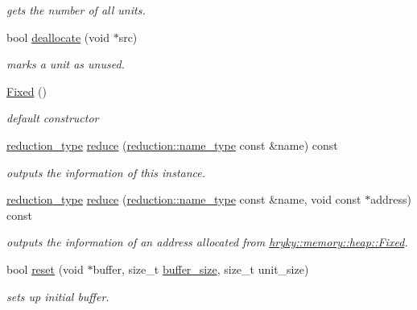 \begin{DoxyCompactItemize}
\begin{DoxyCompactList}\small\item\em gets the number of all units. \end{DoxyCompactList}\item 
bool \hyperlink{classhryky_1_1memory_1_1heap_1_1_fixed_a878f3a61bf397f27c40ec6638b88bd49}{deallocate} (void $\ast$src)
\begin{DoxyCompactList}\small\item\em marks a unit as unused. \end{DoxyCompactList}\item 
\hyperlink{classhryky_1_1memory_1_1heap_1_1_fixed_ab063172ff9026356d34cac6dc39a207a}{Fixed} ()
\begin{DoxyCompactList}\small\item\em default constructor \end{DoxyCompactList}\item 
\hyperlink{namespacehryky_a343a9a4c36a586be5c2693156200eadc}{reduction\-\_\-type} \hyperlink{classhryky_1_1memory_1_1heap_1_1_fixed_ae7e05d5e6c2e2f83e1d593f4eab28bd7}{reduce} (\hyperlink{namespacehryky_1_1reduction_ac686c30a4c8d196bbd0f05629a6b921f}{reduction\-::name\-\_\-type} const \&name) const 
\begin{DoxyCompactList}\small\item\em outputs the information of this instance. \end{DoxyCompactList}\item 
\hyperlink{namespacehryky_a343a9a4c36a586be5c2693156200eadc}{reduction\-\_\-type} \hyperlink{classhryky_1_1memory_1_1heap_1_1_fixed_a2bf9c59881f3e171d4e78b7fc0393f64}{reduce} (\hyperlink{namespacehryky_1_1reduction_ac686c30a4c8d196bbd0f05629a6b921f}{reduction\-::name\-\_\-type} const \&name, void const $\ast$address) const 
\begin{DoxyCompactList}\small\item\em outputs the information of an address allocated from \hyperlink{classhryky_1_1memory_1_1heap_1_1_fixed}{hryky\-::memory\-::heap\-::\-Fixed}. \end{DoxyCompactList}\item 
bool \hyperlink{classhryky_1_1memory_1_1heap_1_1_fixed_a8ca3a34f0e32b9aa3175b0a76da9c72c}{reset} (void $\ast$buffer, size\-\_\-t \hyperlink{classhryky_1_1memory_1_1heap_1_1_fixed_adb07b62b615fd87ae28633a824635465}{buffer\-\_\-size}, size\-\_\-t unit\-\_\-size)
\begin{DoxyCompactList}\small\item\em sets up initial buffer. \end{DoxyCompactList}\item 

\end{DoxyCompactItemize}
